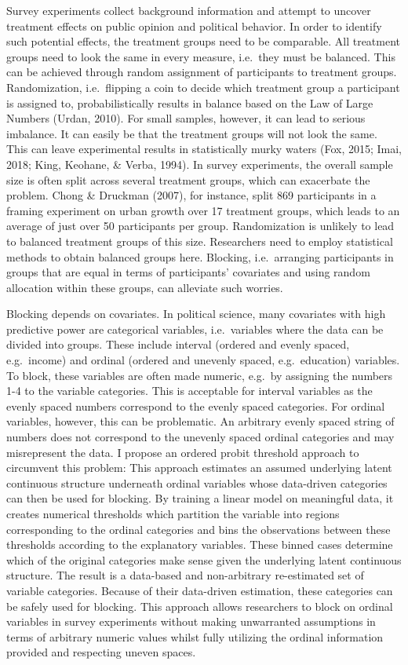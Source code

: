 \documentclass[12pt,econ]{sources/authesis}
\begin{document}
Survey experiments collect background information and attempt to uncover treatment effects on public opinion and political behavior. In order to identify such potential effects, the treatment groups need to be comparable. All treatment groups need to look the same in every measure, i.e.~they must be balanced. This can be achieved through random assignment of participants to treatment groups. Randomization, i.e.~flipping a coin to decide which treatment group a participant is assigned to, probabilistically results in balance based on the Law of Large Numbers (Urdan, 2010). For small samples, however, it can lead to serious imbalance. It can easily be that the treatment groups will not look the same. This can leave experimental results in statistically murky waters (Fox, 2015; Imai, 2018; King, Keohane, \& Verba, 1994). In survey experiments, the overall sample size is often split across several treatment groups, which can exacerbate the problem. Chong \& Druckman (2007), for instance, split 869 participants in a framing experiment on urban growth over 17 treatment groups, which leads to an average of just over 50 participants per group. Randomization is unlikely to lead to balanced treatment groups of this size. Researchers need to employ statistical methods to obtain balanced groups here. Blocking, i.e.~arranging participants in groups that are equal in terms of participants' covariates and using random allocation within these groups, can alleviate such worries.

Blocking depends on covariates. In political science, many covariates with high predictive power are categorical variables, i.e.~variables where the data can be divided into groups. These include interval (ordered and evenly spaced, e.g.~income) and ordinal (ordered and unevenly spaced, e.g.~education) variables. To block, these variables are often made numeric, e.g.~by assigning the numbers 1-4 to the variable categories. This is acceptable for interval variables as the evenly spaced numbers correspond to the evenly spaced categories. For ordinal variables, however, this can be problematic. An arbitrary evenly spaced string of numbers does not correspond to the unevenly spaced ordinal categories and may misrepresent the data. I propose an ordered probit threshold approach to circumvent this problem: This approach estimates an assumed underlying latent continuous structure underneath ordinal variables whose data-driven categories can then be used for blocking. By training a linear model on meaningful data, it creates numerical thresholds which partition the variable into regions corresponding to the ordinal categories and bins the observations between these thresholds according to the explanatory variables. These binned cases determine which of the original categories make sense given the underlying latent continuous structure. The result is a data-based and non-arbitrary re-estimated set of variable categories. Because of their data-driven estimation, these categories can be safely used for blocking. This approach allows researchers to block on ordinal variables in survey experiments without making unwarranted assumptions in terms of arbitrary numeric values whilst fully utilizing the ordinal information provided and respecting uneven spaces.
\end{document}
